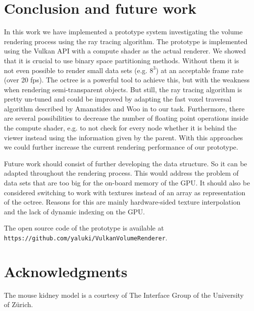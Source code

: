 \documentclass[12pt,conference]{IEEEtran}
\begin{document}
\section{Conclusion and future work}
\label{conclusion}
In this work we have implemented a prototype system investigating the volume rendering process using the ray tracing algorithm. The prototype is implemented using the Vulkan API with a compute shader as the actual renderer. We showed that it is crucial to use binary space partitioning methods. Without them it is not even possible to render small data sets (e.g. $8^3$) at an acceptable frame rate (over 20 fps). The octree is a powerful tool to achieve this, but with the weakness when rendering semi-transparent objects. But still, the ray tracing algorithm is pretty un-tuned and could be improved by adapting the fast voxel traversal algorithm described by Amanatides and Woo in \cite{amanatides1987fast} to our task. Furthermore, there are several possibilities to decrease the number of floating point operations inside the compute shader, e.g. to not check for every node whether it is behind the viewer instead using the information given by the parent. With this approaches we could further increase the current rendering performance of our prototype.
\par
Future work should consist of further developing the data structure. So it can be adapted throughout the rendering process. This would address the problem of data sets that are too big for the on-board memory of the GPU. It should also be considered switching to work with textures instead of an array as representation of the octree. Reasons for this are mainly hardware-sided texture interpolation and the lack of dynamic indexing on the GPU.
\par
The open source code of the prototype is available at \texttt{https://github.com/yaluki/\allowbreak VulkanVolumeRenderer}.

\section{Acknowledgments}
The mouse kidney model is a courtesy of The Interface Group of the University of Zürich.



\end{document}
